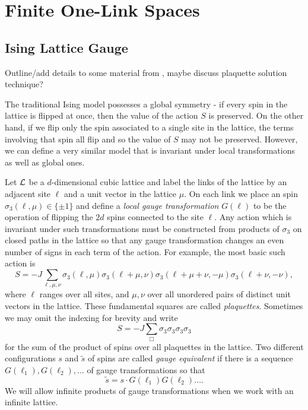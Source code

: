 \documentclass[11pt,reqno]{amsart}
\numberwithin{equation}{section}
\begin{document}
	\section{Finite One-Link Spaces}
	\subsection{Ising Lattice Gauge}
	
	Outline/add details to some material from \cite{KogutGaugeSummary}, maybe discuss \cite{MuellerJohnstonJanke17} plaquette solution technique?
	
	The traditional Ising model possesses a global symmetry - if every spin in the lattice is flipped at once, then the value of the action $S$ is preserved.
	On the other hand, if we flip only the spin associated to a single site in the lattice, the terms involving that spin all flip and so the value of $S$ may not be preserved.
	However, we can define a very similar model that is invariant under local transformations as well as global ones.
	
	Let $\mathcal{L}$ be a $d$-dimensional cubic lattice and label the links of the lattice by an adjacent site $\ell$ and a unit vector in the lattice $\mu$. 
	On each link we place an spin $\sigma_3(\ell,\mu)\in \{\pm 1\}$ and define a \emph{local gauge transformation} $G(\ell)$ to be the operation of flipping the $2d$ spins connected to the site $\ell$.
	Any action which is invariant under such transformations must be constructed from products of $\sigma_3$ on closed paths in the lattice so that any gauge transformation changes an even number of signs in each term of the action.
	For example, the most basic such action is 
		\[S=-J\sum_{\ell,\mu,\nu}\sigma_3(\ell,\mu)\sigma_3(\ell+\mu,\nu)\sigma_3(\ell+\mu+\nu,-\mu)\sigma_3(\ell+\nu,-\nu), \]
	where $\ell$ ranges over all sites, and $\mu,\nu$ over all unordered pairs of distinct unit vectors in the lattice.
	These fundamental squares are called \emph{plaquettes}.
	Sometimes we may omit the indexing for brevity and write
		\[S=-J\sum_{\Box} \sigma_3\sigma_3\sigma_3\sigma_3 \]
	for the sum of the product of spins over all plaquettes in the lattice. 
	Two different configurations $s$ and $\tilde{s}$ of spins are called \emph{gauge equivalent} if there is a sequence $G(\ell_1),G(\ell_2),\ldots$ of gauge transformations so that 
		\[ \tilde{s}=s\cdot G(\ell_1)G(\ell_2)\ldots. \]
	We will allow infinite products of gauge transformations when we work with an infinite lattice.
	
\end{document}
